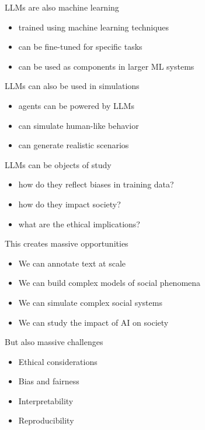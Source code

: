 \documentclass[
  ignorenonframetext,
]{beamer}
\providecommand{\tightlist}{%
  \setlength{\itemsep}{0pt}\setlength{\parskip}{0pt}}
\begin{document}
\begin{frame}{LLMs are also machine learning}
\label{llms-are-also-machine-learning}
\begin{itemize}[<+->]
\tightlist
\item
  trained using machine learning techniques
\item
  can be fine-tuned for specific tasks
\item
  can be used as components in larger ML systems
\end{itemize}
\end{frame}

\begin{frame}{LLMs can also be used in simulations}
\label{llms-can-also-be-used-in-simulations}
\begin{itemize}[<+->]
\tightlist
\item
  agents can be powered by LLMs
\item
  can simulate human-like behavior
\item
  can generate realistic scenarios
\end{itemize}
\end{frame}

\begin{frame}{LLMs can be objects of study}
\label{llms-can-be-objects-of-study}
\begin{itemize}[<+->]
\tightlist
\item
  how do they reflect biases in training data?
\item
  how do they impact society?
\item
  what are the ethical implications?
\end{itemize}
\end{frame}

\begin{frame}{This creates massive opportunities}
\label{this-creates-massive-opportunities}
\begin{itemize}[<+->]
\tightlist
\item
  We can annotate text at scale
\item
  We can build complex models of social phenomena
\item
  We can simulate complex social systems
\item
  We can study the impact of AI on society
\end{itemize}
\end{frame}

\begin{frame}{But also massive challenges}
\label{but-also-massive-challenges}
\begin{itemize}[<+->]
\tightlist
\item
  Ethical considerations
\item
  Bias and fairness
\item
  Interpretability
\item
  Reproducibility
\end{itemize}
\end{frame}
\end{document}
